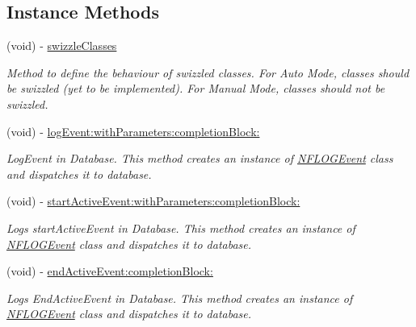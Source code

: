 \subsection*{Instance Methods}
\begin{DoxyCompactItemize}
\item 
\mbox{\label{protocol_n_f_l_o_g_behaviour_01-p_ab0e50ce3a4a91cba687eec9cd21e9a78}} 
(void) -\/ \hyperlink{protocol_n_f_l_o_g_behaviour_01-p_ab0e50ce3a4a91cba687eec9cd21e9a78}{swizzle\+Classes}
\begin{DoxyCompactList}\small\item\em Method to define the behaviour of swizzled classes. For Auto Mode, classes should be swizzled (yet to be implemented). For Manual Mode, classes should not be swizzled. \end{DoxyCompactList}\item 
\mbox{\label{protocol_n_f_l_o_g_behaviour_01-p_afcac3d44d23654909ae1da3ee5c61840}} 
(void) -\/ \hyperlink{protocol_n_f_l_o_g_behaviour_01-p_afcac3d44d23654909ae1da3ee5c61840}{log\+Event\+:with\+Parameters\+:completion\+Block\+:}
\begin{DoxyCompactList}\small\item\em Log\+Event in Database. This method creates an instance of \hyperlink{interface_n_f_l_o_g_event}{N\+F\+L\+O\+G\+Event} class and dispatches it to database. \end{DoxyCompactList}\item 
\mbox{\label{protocol_n_f_l_o_g_behaviour_01-p_a33b7f90b7f9108d33592e0916f5503f5}} 
(void) -\/ \hyperlink{protocol_n_f_l_o_g_behaviour_01-p_a33b7f90b7f9108d33592e0916f5503f5}{start\+Active\+Event\+:with\+Parameters\+:completion\+Block\+:}
\begin{DoxyCompactList}\small\item\em Logs start\+Active\+Event in Database. This method creates an instance of \hyperlink{interface_n_f_l_o_g_event}{N\+F\+L\+O\+G\+Event} class and dispatches it to database. \end{DoxyCompactList}\item 
\mbox{\label{protocol_n_f_l_o_g_behaviour_01-p_a040b1fc4ce9a3e52b89043fd49d86409}} 
(void) -\/ \hyperlink{protocol_n_f_l_o_g_behaviour_01-p_a040b1fc4ce9a3e52b89043fd49d86409}{end\+Active\+Event\+:completion\+Block\+:}
\begin{DoxyCompactList}\small\item\em Logs End\+Active\+Event in Database. This method creates an instance of \hyperlink{interface_n_f_l_o_g_event}{N\+F\+L\+O\+G\+Event} class and dispatches it to database. \end{DoxyCompactList}\end{DoxyCompactItemize}


